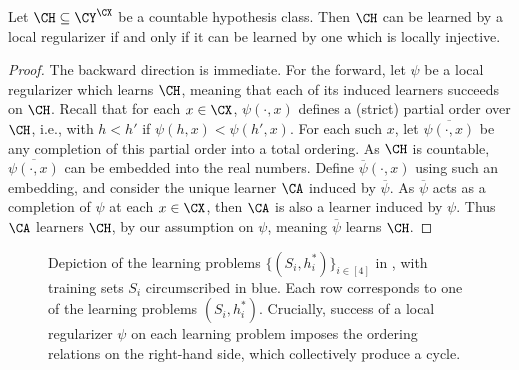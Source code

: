 \begin{lemma}\label{Lemma:locally-injective-regularizer}
Let $\CH \subseteq \CY^\CX$ be a countable hypothesis class. Then $\CH$ can be learned by a local regularizer if and only if it can be learned by one which is locally injective. 
\end{lemma}
\begin{proof}
The backward direction is immediate. For the forward, let $\psi$ be a local regularizer which learns $\CH$, meaning that each of its induced learners succeeds on $\CH$. Recall that for each $x \in \CX$, $\psi( \cdot, x)$ defines a (strict) partial order over $\CH$, i.e., with $h < h'$ if $\psi(h, x) < \psi(h', x)$. For each such $x$, let $\overline{\psi(\cdot, x)}$ be any completion of this partial order into a total ordering. As $\CH$ is countable, $\overline{\psi(\cdot, x)}$ can be embedded into the real numbers. Define $\overline{\psi}(\cdot, x)$ using such an embedding, and consider the unique learner $\CA$ induced by $\overline{\psi}$. As $\overline{\psi}$ acts as a completion of $\psi$ at each $x \in \CX$, then $\CA$ is also a learner induced by $\psi$. Thus $\CA$ learners $\CH$, by our assumption on $\psi$, meaning $\overline{\psi}$ learns $\CH$. 
\end{proof}

\begin{figure}[t] 
\centering

\vspace{-40 pt}
\caption{Depiction of the learning problems $\{(S_i,h^*_i)\}_{i \in [4]}$ in , with training sets $S_i$ circumscribed in blue. Each row corresponds to one of the learning problems $(S_i,h^*_i)$. Crucially, success of a local regularizer $\psi$ on each learning problem imposes the ordering relations on the right-hand side, which collectively produce a cycle.} \label{Figure:1}
\label{figure:bipartite}
\end{figure}

